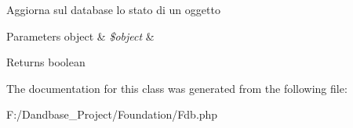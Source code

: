 Aggiorna sul database lo stato di un oggetto


\begin{DoxyParams}[1]{Parameters}
object & {\em \$object} & \\
\hline
\end{DoxyParams}
\begin{DoxyReturn}{Returns}
boolean 
\end{DoxyReturn}


The documentation for this class was generated from the following file\+:\begin{DoxyCompactItemize}
\item 
F\+:/\+Dandbase\+\_\+\+Project/\+Foundation/Fdb.\+php\end{DoxyCompactItemize}
